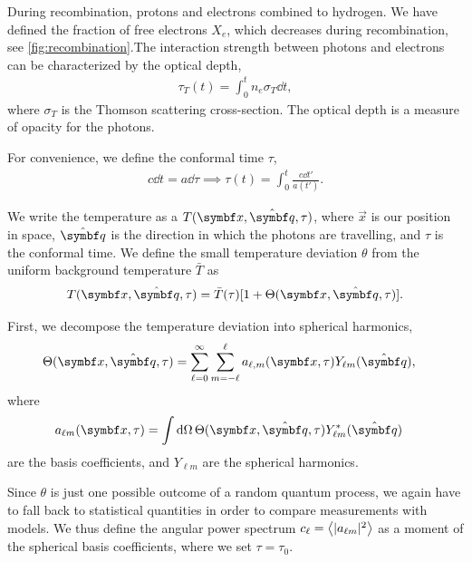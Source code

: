 During recombination, protons and electrons combined to hydrogen. We have defined the fraction of free electrons $X_e$, which decreases during recombination, see \cref{fig:recombination}.The interaction strength between photons and electrons can be characterized by the optical depth,
\begin{align*}
	\tau_T(t) = \int_0^t n_e \sigma_T \dd{t},
\end{align*}
where $\sigma_T$ is the Thomson scattering cross-section. The optical depth is a measure of opacity for the photons.

For convenience, we define the conformal time $\tau$,
\begin{align*}
	c \dd{t} = a \dd{\tau}
	\implies \tau(t) = \int_0^t \frac{c \dd{t'}}{a(t')}.
\end{align*}

We write the temperature as a $T(\vec{x}, \uvec{q}, \tau)$, where $\vec{x}$ is our position in space, $\uvec{q}$ is the direction in which the photons are travelling, and $\tau$ is the conformal time. We define the small temperature deviation $\theta$ from the uniform background temperature $\bar{T}$ as
\begin{align*}
	T(\vec{x}, \uvec{q}, \tau) = \bar{T}(\tau) [1 + \Theta(\vec{x}, \uvec{q}, \tau)].
\end{align*}

First, we decompose the temperature deviation into spherical harmonics,
\begin{align*}
	\Theta(\vec{x}, \uvec{q}, \tau)
	&= \sum_{\ell=0}^{\infty} \sum_{m=-\ell}^{\ell} a_{\ell,m}(\vec{x}, \tau) Y_{\ell m}(\uvec{q}),
\end{align*}
where 
\begin{align*}
	a_{\ell m}(\vec{x}, \tau)
	&= \int \dd{\Omega} \Theta(\vec{x}, \uvec{q}, \tau) Y^*_{\ell m}(\uvec{q}) 	
\end{align*}
are the basis coefficients, and $Y_{\ell m}$ are the spherical harmonics.

Since $\theta$ is just one possible outcome of a random quantum process, we again have to fall back to statistical quantities in order to compare measurements with models.
We thus define the angular power spectrum $c_\ell = \left\langle \vert a_{\ell m}\vert^2 \right\rangle$ as a moment of the spherical basis coefficients, where we set $\tau = \tau_0$.

